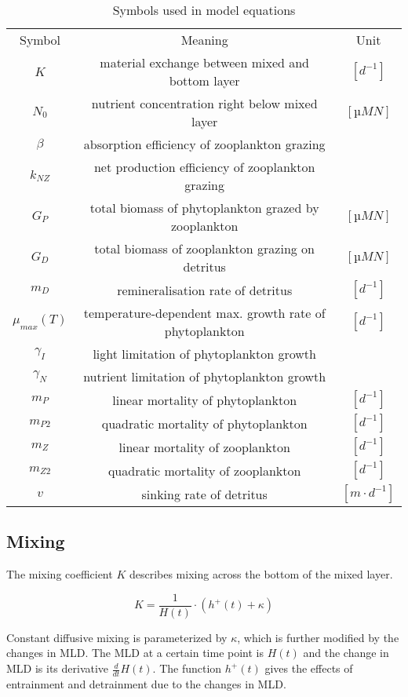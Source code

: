 \documentclass[journal abbreviation, manuscript]{copernicus}
\begin{document}
\begin{table*}[t]
\caption{Symbols used in model equations}
\begin{tabular}{c c c}
Symbol & Meaning & Unit\\
\tophline
$K$ & material exchange between mixed and bottom layer & $[d^{-1}]$ \\
$N_0$ & nutrient concentration right below mixed layer & $[µM N]$ \\
$\beta$ & absorption efficiency of zooplankton grazing &  \\
$k_{NZ}$ & net production efficiency of zooplankton grazing &  \\
$G_P$ & total biomass of phytoplankton grazed by zooplankton & $[µM N]$ \\
$G_D$ & total biomass of zooplankton grazing on detritus & $[µM N]$ \\
$m_D$ & remineralisation rate of detritus & $[d^{-1}]$ \\
$\mu_{max}(T)$ & temperature-dependent max. growth rate of phytoplankton & $[d^{-1}]$ \\
$\gamma_I$ & light limitation of phytoplankton growth &  \\
$\gamma_N$ & nutrient limitation of phytoplankton growth &  \\
$m_P$ & linear mortality of phytoplankton & $[d^{-1}]$ \\
$m_{P2}$ & quadratic mortality of phytoplankton & $[d^{-1}]$ \\
$m_Z$ & linear mortality of zooplankton & $[d^{-1}]$ \\
$m_{Z2}$ & quadratic mortality of zooplankton & $[d^{-1}]$ \\
$v$ & sinking rate of detritus & $[m \cdot d^{-1}]$\\
\end{tabular}
\end{table*}
\subsection{Mixing}

The mixing coefficient $K$ describes mixing across the bottom of the mixed layer.

\begin{equation}
    K = \frac{1}{H(t)} \cdot \left(h^{+}(t) + \kappa\right)
\end{equation}

Constant diffusive mixing is parameterized by $\kappa$, which is further modified by the changes in MLD. The MLD at a certain time point is $H(t)$ and the change in MLD is its derivative $\frac{d}{d t} H(t)$. The function $h^{+}(t)$ gives the effects of entrainment and detrainment due to the changes in MLD.
\end{document}
